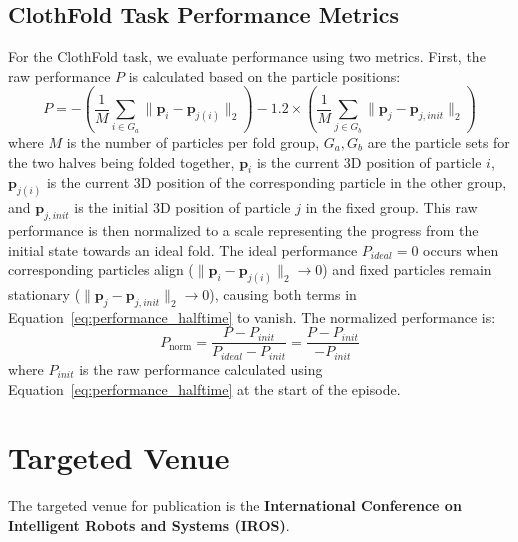 \documentclass{article}
\begin{document}
\subsection*{ClothFold Task Performance Metrics}
For the ClothFold task, we evaluate performance using two metrics. First, the raw performance \(P\) is calculated based on the particle positions:
\begin{equation} \label{eq:performance_halftime}
P = - \left( \frac{1}{M} \sum_{i \in G_a} \| \mathbf{p}_i - \mathbf{p}_{j(i)} \|_2 \right) - 1.2 \times \left( \frac{1}{M} \sum_{j \in G_b} \| \mathbf{p}_j - \mathbf{p}_{j, init} \|_2 \right)
\end{equation}
where \(M\) is the number of particles per fold group, \(G_a, G_b\) are the particle sets for the two halves being folded together, \(\mathbf{p}_i\) is the current 3D position of particle \(i\), \(\mathbf{p}_{j(i)}\) is the current 3D position of the corresponding particle in the other group, and \(\mathbf{p}_{j, init}\) is the initial 3D position of particle \(j\) in the fixed group.
This raw performance is then normalized to a scale representing the progress from the initial state towards an ideal fold. The ideal performance \(P_{ideal} = 0\) occurs when corresponding particles align (\(\| \mathbf{p}_i - \mathbf{p}_{j(i)} \|_2 \to 0\)) and fixed particles remain stationary (\(\| \mathbf{p}_j - \mathbf{p}_{j, init} \|_2 \to 0\)), causing both terms in Equation~\eqref{eq:performance_halftime} to vanish. The normalized performance is:
\begin{equation} \label{eq:norm_performance_halftime}
P_{\text{norm}} = \frac{P - P_{init}}{P_{ideal} - P_{init}} = \frac{P - P_{init}}{- P_{init}}
\end{equation}
where \(P_{init}\) is the raw performance calculated using Equation~\eqref{eq:performance_halftime} at the start of the episode.


\section*{Targeted Venue}
The targeted venue for publication is the \textbf{International Conference on Intelligent Robots and Systems (IROS)}.



\end{document}
